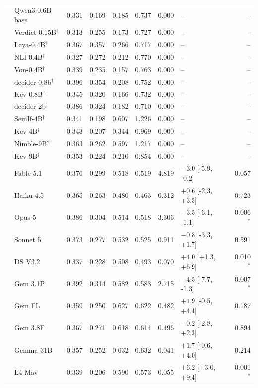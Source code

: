 \begin{longtable}{llrrrrrlr}
 & Qwen3-0.6B base & 0.331 & 0.169 & 0.185 & 0.737 & 0.000 & -- & -- \\
 & Verdict-0.15B$^{\dagger}$ & 0.313 & 0.255 & 0.173 & 0.727 & 0.000 & -- & -- \\
 & Laya-0.4B$^{\dagger}$ & 0.367 & 0.357 & 0.266 & 0.717 & 0.000 & -- & -- \\
 & NLI-0.4B$^{\dagger}$ & 0.327 & 0.272 & 0.212 & 0.770 & 0.000 & -- & -- \\
 & Von-0.4B$^{\dagger}$ & 0.339 & 0.235 & 0.157 & 0.763 & 0.000 & -- & -- \\
 & decider-0.8b$^{\dagger}$ & 0.396 & 0.354 & 0.208 & 0.752 & 0.000 & -- & -- \\
 & Kev-0.8B$^{\dagger}$ & 0.345 & 0.320 & 0.166 & 0.732 & 0.000 & -- & -- \\
 & decider-2b$^{\dagger}$ & 0.386 & 0.324 & 0.182 & 0.710 & 0.000 & -- & -- \\
 & SemIf-4B$^{\dagger}$ & 0.341 & 0.198 & 0.607 & 1.226 & 0.000 & -- & -- \\
 & Kev-4B$^{\dagger}$ & 0.343 & 0.207 & 0.344 & 0.969 & 0.000 & -- & -- \\
 & Nimble-9B$^{\dagger}$ & 0.363 & 0.262 & 0.597 & 1.217 & 0.000 & -- & -- \\
 & Kev-9B$^{\dagger}$ & 0.353 & 0.224 & 0.210 & 0.854 & 0.000 & -- & -- \\
 & Fable 5.1 & 0.376 & 0.299 & 0.518 & 0.519 & 4.819 & $-3.0$ [-5.9, -0.2] & 0.057 \\
 & Haiku 4.5 & 0.365 & 0.263 & 0.480 & 0.463 & 0.312 & $+0.6$ [-2.3, +3.5] & 0.723 \\
 & Opus 5 & 0.386 & 0.304 & 0.514 & 0.518 & 3.306 & $-3.5$ [-6.1, -1.1] & 0.006$^{*}$ \\
 & Sonnet 5 & 0.373 & 0.277 & 0.532 & 0.525 & 0.911 & $-0.8$ [-3.3, +1.7] & 0.591 \\
 & DS V3.2 & 0.337 & 0.228 & 0.508 & 0.493 & 0.070 & $+4.0$ [+1.3, +6.9] & 0.010$^{*}$ \\
 & Gem 3.1P & 0.392 & 0.314 & 0.582 & 0.583 & 2.715 & $-4.5$ [-7.7, -1.3] & 0.007$^{*}$ \\
 & Gem FL & 0.359 & 0.250 & 0.627 & 0.622 & 0.482 & $+1.9$ [-0.5, +4.4] & 0.187 \\
 & Gem 3.8F & 0.367 & 0.271 & 0.618 & 0.614 & 0.496 & $-0.2$ [-2.8, +2.3] & 0.894 \\
 & Gemma 31B & 0.357 & 0.252 & 0.632 & 0.632 & 0.041 & $+1.7$ [-0.6, +4.0] & 0.214 \\
 & L4 Mav & 0.339 & 0.206 & 0.590 & 0.573 & 0.055 & $+6.2$ [+3.0, +9.4] & 0.001$^{*}$ \\

\end{longtable}
